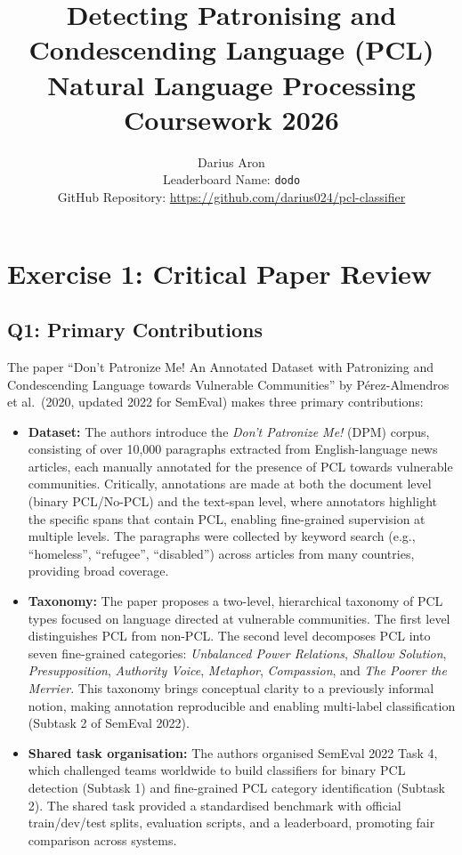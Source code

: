 \documentclass[11pt]{article}
\title{Detecting Patronising and Condescending Language (PCL) \\
Natural Language Processing Coursework 2026}
\author{Darius Aron \\
Leaderboard Name: \texttt{dodo} \\
GitHub Repository: \url{https://github.com/darius024/pcl-classifier}}
\date{}
\begin{document}
\maketitle
\thispagestyle{empty}

\newpage
\tableofcontents

\clearpage
\section{Exercise 1: Critical Paper Review}
\label{sec:review}

\subsection{Q1: Primary Contributions}

The paper ``Don't Patronize Me! An Annotated Dataset with Patronizing and Condescending Language towards Vulnerable Communities'' by Pérez-Almendros et al.\ (2020, updated 2022 for SemEval) makes three primary contributions:

\begin{itemize}
    \item \textbf{Dataset:} The authors introduce the \emph{Don't Patronize Me!} (DPM) corpus, consisting of over 10,000 paragraphs extracted from English-language news articles, each manually annotated for the presence of PCL towards vulnerable communities. Critically, annotations are made at both the document level (binary PCL/No-PCL) and the text-span level, where annotators highlight the specific spans that contain PCL, enabling fine-grained supervision at multiple levels. The paragraphs were collected by keyword search (e.g., ``homeless'', ``refugee'', ``disabled'') across articles from many countries, providing broad coverage.

    \item \textbf{Taxonomy:} The paper proposes a two-level, hierarchical taxonomy of PCL types focused on language directed at vulnerable communities. The first level distinguishes PCL from non-PCL. The second level decomposes PCL into seven fine-grained categories: \emph{Unbalanced Power Relations}, \emph{Shallow Solution}, \emph{Presupposition}, \emph{Authority Voice}, \emph{Metaphor}, \emph{Compassion}, and \emph{The Poorer the Merrier}. This taxonomy brings conceptual clarity to a previously informal notion, making annotation reproducible and enabling multi-label classification (Subtask 2 of SemEval 2022).

    \item \textbf{Shared task organisation:} The authors organised SemEval 2022 Task 4, which challenged teams worldwide to build classifiers for binary PCL detection (Subtask 1) and fine-grained PCL category identification (Subtask 2). The shared task provided a standardised benchmark with official train/dev/test splits, evaluation scripts, and a leaderboard, promoting fair comparison across systems.
\end{itemize}
\end{document}
